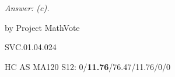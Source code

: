 
{\it Answer:  (c).}

\medskip
by Project MathVote

SVC.01.04.024

HC AS MA120 S12: 0/{\bf11.76}/76.47/11.76/0/0  \\
